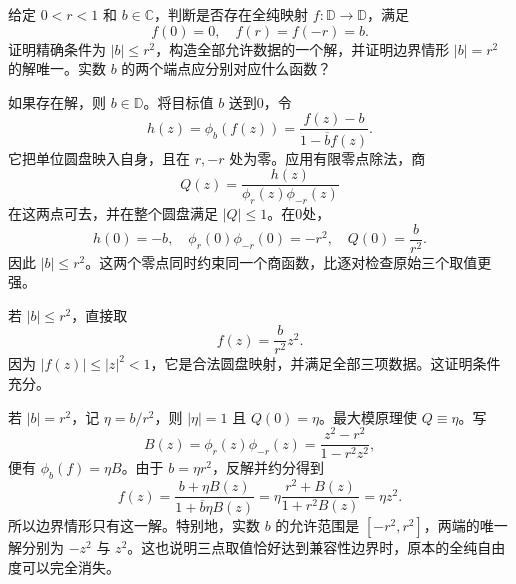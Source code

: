 \begin{exercise}\label{b3:ex:06-4}
给定 \(0<r<1\) 和 \(b\in\mathbb C\)，判断是否存在全纯映射 \(f:\mathbb D\rightarrow\mathbb D\)，满足
\[
 f(0)=0,\quad f(r)=f(-r)=b.
\]
证明精确条件为 \(|b|\le r^2\)，构造全部允许数据的一个解，并证明边界情形 \(|b|=r^2\) 的解唯一。实数 \(b\) 的两个端点应分别对应什么函数？
\end{exercise}
\begin{solution}
如果存在解，则 \(b\in\mathbb D\)。将目标值 \(b\) 送到0，令
\[
 h(z)=\phi_b(f(z))=\frac{f(z)-b}{1-\overline b f(z)}.
\]
它把单位圆盘映入自身，且在 \(r,-r\) 处为零。应用有限零点除法，商
\[
 Q(z)=\frac{h(z)}{\phi_r(z)\phi_{-r}(z)}
\]
在这两点可去，并在整个圆盘满足 \(|Q|\le1\)。在0处，
\[
 h(0)=-b,\quad
 \phi_r(0)\phi_{-r}(0)=-r^2,\quad
 Q(0)=\frac b{r^2}.
\]
因此 \(|b|\le r^2\)。这两个零点同时约束同一个商函数，比逐对检查原始三个取值更强。

若 \(|b|\le r^2\)，直接取
\[
 f(z)=\frac b{r^2}z^2.
\]
因为 \(|f(z)|\le|z|^2<1\)，它是合法圆盘映射，并满足全部三项数据。这证明条件充分。

若 \(|b|=r^2\)，记 \(\eta=b/r^2\)，则 \(|\eta|=1\) 且 \(Q(0)=\eta\)。最大模原理使 \(Q\equiv\eta\)。写
\[
 B(z)=\phi_r(z)\phi_{-r}(z)
     =\frac{z^2-r^2}{1-r^2z^2},
\]
便有 \(\phi_b(f)=\eta B\)。由于 \(b=\eta r^2\)，反解并约分得到
\[
 f(z)=\frac{b+\eta B(z)}{1+\overline b\eta B(z)}
     =\eta\frac{r^2+B(z)}{1+r^2B(z)}
     =\eta z^2.
\]
所以边界情形只有这一解。特别地，实数 \(b\) 的允许范围是 \([-r^2,r^2]\)，两端的唯一解分别为 \(-z^2\) 与 \(z^2\)。这也说明三点取值恰好达到兼容性边界时，原本的全纯自由度可以完全消失。
\end{solution}


